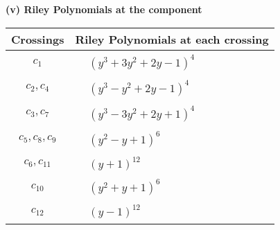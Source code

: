 \documentclass[1p]{elsarticle_modified}
\theoremstyle{definition}
\begin{document}
\newpage\renewcommand{\arraystretch}{1}
\flushleft \textbf{(v) Riley Polynomials at the component}\newline \\
\begin{tabular}{m{50pt}|m{274pt}}
Crossings & \hspace{64pt}Riley Polynomials at each crossing \\
\hline $$\begin{aligned}c_{1}\end{aligned}$$&$\begin{aligned}
&(y^3+3 y^2+2 y-1)^4
\end{aligned}$\\
\hline $$\begin{aligned}c_{2},c_{4}\end{aligned}$$&$\begin{aligned}
&(y^3- y^2+2 y-1)^4
\end{aligned}$\\
\hline $$\begin{aligned}c_{3},c_{7}\end{aligned}$$&$\begin{aligned}
&(y^3-3 y^2+2 y+1)^4
\end{aligned}$\\
\hline $$\begin{aligned}c_{5},c_{8},c_{9}\end{aligned}$$&$\begin{aligned}
&(y^2- y+1)^6
\end{aligned}$\\
\hline $$\begin{aligned}c_{6},c_{11}\end{aligned}$$&$\begin{aligned}
&(y+1)^{12}
\end{aligned}$\\
\hline $$\begin{aligned}c_{10}\end{aligned}$$&$\begin{aligned}
&(y^2+y+1)^6
\end{aligned}$\\
\hline $$\begin{aligned}c_{12}\end{aligned}$$&$\begin{aligned}
&(y-1)^{12}
\end{aligned}$\\
\hline
\end{tabular}\\~\\
\end{document}
